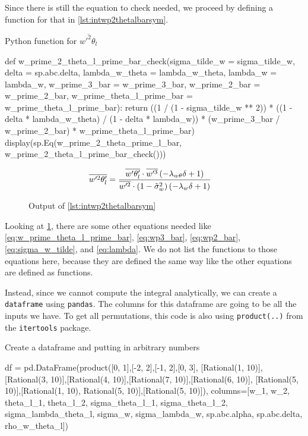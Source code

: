 \noindent
Since there is still the equation to check needed, we proceed by defining a function for that in \cref{lst:intwp2thetalbarsym}.
\begin{listing}[!ht]
    \caption{Python function for $\overline{w'^2\theta_l}$}
    \label{lst:intwp2thetalbarsym}
    \begin{pythoncode}
        def w_prime_2_theta_l_prime_bar_check(sigma_tilde_w = sigma_tilde_w, 
            delta = sp.abc.delta, lambda_w_theta = lambda_w_theta, lambda_w = lambda_w, 
            w_prime_3_bar = w_prime_3_bar, w_prime_2_bar = w_prime_2_bar, 
            w_prime_theta_l_prime_bar = w_prime_theta_l_prime_bar):
            return ((1 / (1 - sigma_tilde_w ** 2)) *
                ((1 - delta * lambda_w_theta) / (1 - delta * lambda_w)) *
                (w_prime_3_bar / w_prime_2_bar) *
                w_prime_theta_l_prime_bar)
        display(sp.Eq(w_prime_2_theta_prime_l_bar, w_prime_2_theta_l_prime_bar_check()))
    \end{pythoncode}
\end{listing}
\begin{figure}[!ht]
    \centering
    \caption{Output of \cref{lst:intwp2thetalbarsym}}
    \label{fig:intwp2thetalbarsymout}
    \begin{align}
        \nonumber
        \overline{w'^2\theta'_l}
        &= \frac{\overline{w'\theta'_l} \cdot \overline{w'^3} \left(- \lambda_{w\theta} \delta + 1\right)}{\overline{w'^2} \cdot \left(1 - \Tilde{\sigma}_w^{2}\right) \left(- \lambda_{w} \delta + 1\right)}
    \end{align}
\end{figure}
Looking at \cref{fig:intwp2thetalbarsymout}, there are some other equations needed like \cref{eq:w_prime_theta_l_prime_bar}, \cref{eq:wp3_bar}, \cref{eq:wp2_bar}, \cref{eq:sigma_w_tilde}, and \cref{eq:lambda}.
We do not list the functions to those equations here, because they are defined the same way like the other equations are defined as functions.

\noindent
Instead, since we cannot compute the integral analytically, we can create a \texttt{dataframe} using \texttt{pandas}\autocite{mckinney-proc-scipy-2010}.
The columns for this dataframe are going to be all the inputs we have.
To get all permutations, this code is also using \texttt{product(..)} from the \texttt{itertools} package.
\begin{listing}[!ht]
    \caption{Create a dataframe and putting in arbitrary numbers}
    \label{lst:createdataframe}
    \begin{pythoncode}
        df = pd.DataFrame(product([0, 1],[-2, 2],[-1, 2],[0, 3], [Rational(1, 10)],
            [Rational(3, 10)],[Rational(4, 10)],[Rational(7, 10)],[Rational(6, 10)],
            [Rational(5, 10)],[Rational(1, 10), Rational(5, 10)],[Rational(5, 10)]),
            columns=[w_1, w_2, theta_l_1, theta_l_2, sigma_theta_l_1, sigma_theta_l_2, 
            sigma_lambda_theta_l, sigma_w, sigma_lambda_w, sp.abc.alpha, sp.abc.delta,
            rho_w_theta_l])
    \end{pythoncode}
\end{listing}

